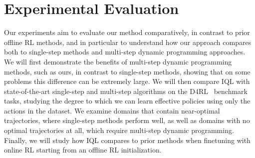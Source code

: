 \documentclass{article} %
\def\ourname{IQL\xspace}
\begin{document}

\section{Experimental Evaluation}

\vspace{-0.4cm}

Our experiments aim to evaluate our method comparatively, in contrast to prior offline RL methods, and in particular to understand how our approach compares both to single-step methods and multi-step dynamic programming approaches. We will first demonstrate the benefits of multi-step dynamic programming methods, such as ours, in contrast to single-step methods, showing that on some problems this difference can be extremely large. We will then compare \ourname with state-of-the-art single-step and multi-step algorithms on the D4RL~\citep{fu2020d4rl} benchmark tasks, studying the degree to which we can learn effective policies using only the actions in the dataset. We examine domains that contain near-optimal trajectories, where single-step methods perform well, as well as domains with no optimal trajectories at all, which require multi-step dynamic programming. Finally, we will study how \ourname compares to prior methods when finetuning with online RL starting from an offline RL initialization.
\end{document}
